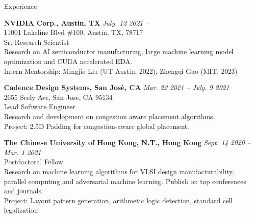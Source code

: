 
\begin{rSection}{Experience}

{\bf NVIDIA Corp., Austin, TX}         \hfill {\em July. 12 2021 -- } \\
11001 Lakeline Blvd \#100, Austin, TX, 78717 \\
Sr. Research Scientist \\
Research on AI semiconductor manufacturing, large machine learning model optimization and CUDA accelerated EDA. \\
Intern Mentorship: Mingjie Liu (UT Austin, 2022), Zhengqi Gao (MIT, 2023)
	
{\bf Cadence Design Systems, San Jos\`{e}, CA}         \hfill {\em Mar. 22 2021 -- July. 9 2021 } \\
2655 Seely Ave, San Jose, CA 95134 \\
Lead Software Engineer \\
Research and development on congestion aware placement algorithms. \\
Project: 2.5D Padding for congestion-aware global placement.
	
{\bf The Chinese University of Hong Kong, N.T., Hong Kong}         \hfill {\em Sept. 14 2020 -- Mar. 1 2021} \\
Postdoctoral Fellow \\
Research on machine learning algorithms for VLSI design manufacturability, parallel computing and adversarial machine learning. Publish on top conferences and journals. \\
Project: Layout pattern generation, arithmetic logic detection, standard cell legalization 


	



\end{rSection}


